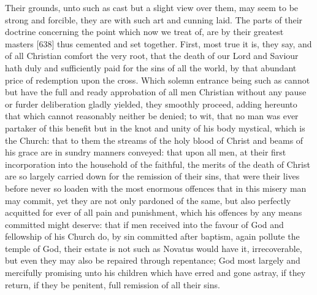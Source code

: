 Their grounds, unto such as cast but a slight view over them, may seem to be strong and forcible, they are with such art and cunning laid. The parts of their doctrine concerning the point which now we treat of, are by their greatest masters [638] thus cemented and set together. First, most true it is, they say, and of all Christian comfort the very root, that the death of our Lord and Saviour hath duly and sufficiently paid for the sins of all the world, by that abundant price of redemption upon the cross. Which solemn entrance being such as cannot but have the full and ready approbation of all men Christian without any pause or furder deliberation gladly yielded, they smoothly proceed, adding hereunto that which cannot reasonably neither be denied; to wit, that no man was ever partaker of this benefit but in the knot and unity of his body mystical, which is the Church: that to them the streams of the holy blood of Christ and beams of his grace are in sundry manners conveyed: that upon all men, at their first incorporation into the household of the faithful, the merits of the death of Christ are so largely carried down for the remission of their sins, that were their lives before never so loaden with the most enormous offences that in this misery man may commit, yet they are not only pardoned of the same, but also perfectly acquitted for ever of all pain and punishment, which his offences by any means committed might deserve: that if men received into the favour of God and fellowship of his Church do, by sin committed after baptism, again pollute the temple of God, their estate is not such as Novatus would have it, irrecoverable, but even they may also be repaired through repentance; God most largely and mercifully promising unto his children which have erred and gone astray, if they return, if they be penitent, full remission of all their sins.

